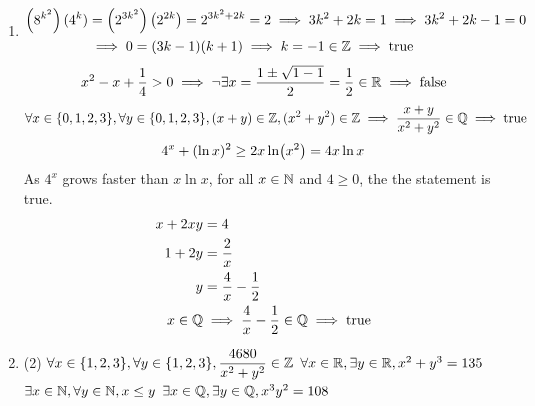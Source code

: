 \documentclass[../MATH135.tex]{subfiles}
\begin{document}
\begin{enumerate}
			\item
				\begin{tasks}
					\task
						\begin{align*}
							\left(8^{k^2}\right)(4^k) &= \left(2^{3k^2}\right)\left(2^{2k}\right)
									= 2^{3k^2 + 2k}
									= 2
									\implies 3k^2 + 2k = 1
									\implies 3k^2 + 2k - 1 = 0 \\
								&\implies 0 = (3k - 1)(k + 1)
								\implies k = -1 \in \mathbb{Z}
								\implies \text{true}	
						\end{align*}
					\task
						\[
							x^2 - x + \frac{1}{4} > 0
								\implies \lnot\exists x = \frac{1 \pm \sqrt{1 - 1}}{2} = \frac{1}{2}\in \mathbb{R}
								\implies \text{false}
						\]
					\task
						\[
							\forall x \in \{0, 1, 2, 3\}, \forall y \in \{0, 1, 2, 3\}, 
								(x + y) \in \mathbb{Z}, 
								(x^2 + y^2) \in \mathbb{Z}
								\implies \frac{x + y}{x^2 + y^2} \in \mathbb{Q}
								\implies \text{true}
						\]
					\task
						\[
							4^x + (\ln x)^2 \ge 2x\ln(x^2)
								= 4x\ln x \\
						\]
						As \(4^x\) grows faster than \(x\ln x\), for all \(x \in \mathbb{N}\) and \(4 \ge 0\), the the statement is true.
					\task
						\begin{align*}
							x + 2xy &= 4 \\
							1 + 2y &= \frac{2}{x} \\
							y &= \frac{4}{x} - \frac{1}{2} \\
							x \in \mathbb{Q} &\implies \frac{4}{x} - \frac{1}{2} \in \mathbb{Q}
									\implies \text{true}
						\end{align*}
				\end{tasks}
			\item
				\begin{tasks}(2)
					\task
						\(\forall x \in \{1, 2, 3\}, \forall y \in \{1, 2, 3\}, \dfrac{4680}{x^2 + y^2} \in \mathbb{Z}\)
					\task
						\(\forall x \in \mathbb{R}, \exists y \in \mathbb{R}, x^2 + y^3 = 135\)
					\task
						\(\exists x \in \mathbb{N}, \forall y \in \mathbb{N}, x \le y\)
					\task
						\(\exists x \in \mathbb{Q}, \exists y \in \mathbb{Q}, x^3y^2 = 108\)
				\end{tasks}
		\end{enumerate}
\end{document}
